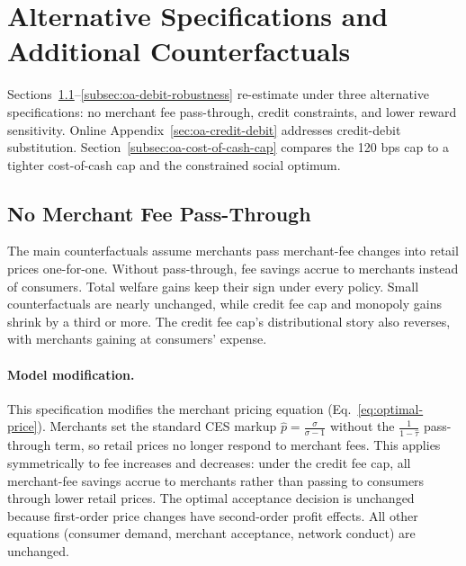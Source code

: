 \documentclass[main.tex]{subfiles}
\begin{document}
\section{Alternative Specifications and Additional Counterfactuals}
\label{sec:oa-alternative-specifications}

Sections~\ref{subsec:oa-no-passthrough}--\ref{subsec:oa-debit-robustness} re-estimate under three alternative specifications: no merchant fee pass-through, credit constraints, and lower reward sensitivity. Online Appendix~\ref{sec:oa-credit-debit} addresses credit-debit substitution. Section~\ref{subsec:oa-cost-of-cash-cap} compares the 120 bps cap to a tighter cost-of-cash cap and the constrained social optimum.


\subsection{No Merchant Fee Pass-Through}
\label{subsec:oa-no-passthrough}

The main counterfactuals assume merchants pass merchant-fee changes into retail prices one-for-one.
Without pass-through, fee savings accrue to merchants instead of consumers.
Total welfare gains keep their sign under every policy.
Small counterfactuals are nearly unchanged, while credit fee cap and monopoly gains shrink by a third or more.
The credit fee cap's distributional story also reverses, with merchants gaining at consumers' expense.

\paragraph{Model modification.} This specification modifies the merchant pricing equation (Eq.~\ref{eq:optimal-price}).
Merchants set the standard CES markup $\hat{p} = \frac{\sigma}{\sigma-1}$ without the $\frac{1}{1-\hat{\tau}}$ pass-through term, so retail prices no longer respond to merchant fees. 
This applies symmetrically to fee increases and decreases: under the credit fee cap, all merchant-fee savings accrue to merchants rather than passing to consumers through lower retail prices. 
The optimal acceptance decision is unchanged because first-order price changes have second-order profit effects. 
All other equations (consumer demand, merchant acceptance, network conduct) are unchanged.
\end{document}
